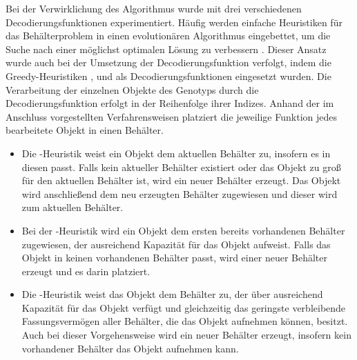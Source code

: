     Bei der Verwirklichung des Algorithmus wurde mit drei verschiedenen Decodierungsfunktionen experimentiert. Häufig werden einfache Heuristiken für das Behälterproblem in einen evolutionären Algorithmus eingebettet, um die Suche nach einer möglichst optimalen Lösung zu verbessern \parencite[64]{MitsuCheng:1999}. Dieser Ansatz wurde auch bei der Umsetzung der Decodierungsfunktion verfolgt, indem die Greedy-Heuristiken \nextfit, \firstfit und \bestfit als Decodierungsfunktionen eingesetzt wurden. Die Verarbeitung der einzelnen Objekte des Genotyps durch die Decodierungsfunktion erfolgt in der Reihenfolge ihrer Indizes. Anhand der im Anschluss vorgestellten Verfahrensweisen platziert die jeweilige Funktion jedes bearbeitete Objekt in einen Behälter.
    \begin{itemize}
    \item Die \textbf{\nextfit}-Heuristik weist ein Objekt dem aktuellen Behälter zu, insofern es in diesen passt. Falls kein aktueller Behälter existiert oder das Objekt zu groß für den aktuellen Behälter ist, wird ein neuer Behälter erzeugt. Das Objekt wird anschließend dem neu erzeugten Behälter zugewiesen und dieser wird zum aktuellen Behälter. 
    \item Bei der \textbf{\firstfit}-Heuristik wird ein Objekt dem ersten bereits vorhandenen Behälter zugewiesen, der ausreichend Kapazität für das Objekt aufweist. Falls das Objekt in keinen vorhandenen Behälter passt, wird einer neuer Behälter erzeugt und es darin platziert.
    \item Die \textbf{\bestfit}-Heuristik weist das Objekt dem Behälter zu, der über ausreichend Kapazität für das Objekt verfügt und gleichzeitig das geringste verbleibende Fassungsvermögen aller Behälter, die das Objekt aufnehmen können, besitzt. Auch bei dieser Vorgehensweise wird ein neuer Behälter erzeugt, insofern kein vorhandener Behälter das Objekt aufnehmen kann. 
    \end{itemize}

